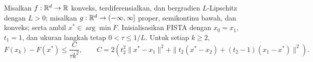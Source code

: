 \begin{theorem}
    Misalkan \(f:\mathbb{R}^d\rightarrow\mathbb{R}\) konveks, terdiferensialkan, dan bergradien \(L\)-Lipschitz dengan \(L>0\); misalkan \(g:\mathbb{R}^d\rightarrow(-\infty,\infty]\) proper, semikontinu bawah, dan konveks; serta ambil \(x^*\in\arg\min F\). Inisialisasikan FISTA dengan \(x_0=x_1\), \(t_1=1\), dan ukuran langkah tetap \(0<\tau\leq1/L\). Untuk setiap \(k\geq2\),
    \begin{equation}
        F(x_k)-F(x^*)\leq\frac{C}{\tau k^2},
        \qquad
        C=2\left(t_2^2\|x^*-x_1\|^2+
        \|t_2(x^*-x_2)+(t_2-1)(x_1-x^*)\|^2\right).
    \end{equation}
\end{theorem}

